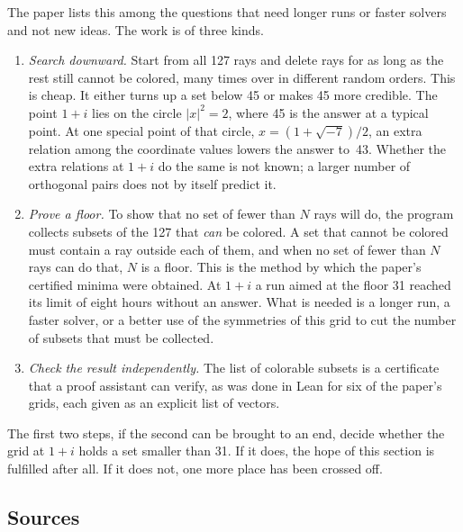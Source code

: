 \documentclass[11pt]{article}
\begin{document}
The paper lists this among the questions that need longer runs or faster solvers and not new
ideas.  The work is of three kinds.
\begin{enumerate}
\item \emph{Search downward.}  Start from all 127 rays and delete rays for as long as the rest
still cannot be colored, many times over in different random orders.  This is cheap.  It either
turns up a set below 45 or makes 45 more credible.  The point $1+i$ lies on the circle
$|x|^2=2$, where 45 is the answer at a typical point.  At one special point of that circle,
$x=(1+\sqrt{-7})/2$, an extra relation among the coordinate values lowers the answer to~43.  Whether the
extra relations at $1+i$ do the same is not known; a larger number of orthogonal pairs does not
by itself predict it.
\item \emph{Prove a floor.}  To show that no set of fewer than $N$ rays will do, the program
collects subsets of the 127 that \emph{can} be colored.  A set that cannot be colored must
contain a ray outside each of them, and when no set of fewer than $N$ rays can do that, $N$ is
a floor.  This is the method by which the paper's certified minima were obtained.  At $1+i$ a
run aimed at the floor 31 reached its limit of eight hours without an answer.  What is needed is a
longer run, a faster solver, or a better use of the symmetries of this grid to cut the number
of subsets that must be collected.
\item \emph{Check the result independently.}  The list of colorable subsets is a certificate that
a proof assistant can verify, as was done in Lean for six of the paper's grids, each given
as an explicit list of vectors.
\end{enumerate}
The first two steps, if the second can be brought to an end, decide whether the grid at $1+i$ holds a set smaller than 31.  If it does,
the hope of this section is fulfilled after all.  If it does not, one more place has been
crossed off.

\subsection*{Sources}
\end{document}
